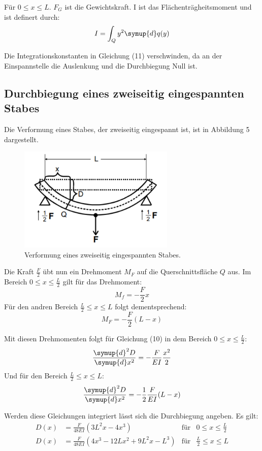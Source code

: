 Für $0 \leq x \leq L$. $F_G$ ist die Gewichtskraft. I ist das Flächenträgheitsmoment und ist definert durch:
\begin{equation}
  I = \int_Q y^2 \symup{d}q(y)
\end{equation}

Die Integrationskonstanten in Gleichung (11) verschwinden, da an der Einspannstelle
die Auslenkung und die Durchbiegung Null ist.

\subsection{Durchbiegung eines zweiseitig eingespannten Stabes}
Die Verformung eines Stabes, der zweiseitig eingespannt ist, ist in Abbildung 5
dargestellt.

\begin{figure}[H]
  \centering
  \includegraphics[height=5cm]{zweiseitig.PNG}
  \caption{Verformung eines zweiseitig eingespannten Stabes. \cite{sample}}
  \label{fig:zweiseitig}
\end{figure}

Die Kraft $\frac{F}{2}$ übt nun ein Drehmoment $M_F$ auf die Querschnittsfläche $Q$ aus.
Im Bereich $0 \leq x \leq \frac{L}{2}$ gilt für das Drehmoment:
\begin{equation}
  M_f = -\frac{F}{2}x
\end{equation}
Für den andren Bereich $\frac{L}{2} \leq x \leq L$ folgt dementsprechend:
\begin{equation}
  M_F = -\frac{F}{2}(L - x)
\end{equation}

Mit diesen Drehmomenten folgt für Gleichung (10) in dem Bereich $0 \leq x \leq \frac{L}{2}$:
\begin{equation}
  \frac{\symup{d}^2 D}{\symup{d} x^2} = - \frac{F}{EI}\frac{x^2}{2}
\end{equation}
Und für den Bereich $\frac{L}{2} \leq x \leq L$:
\begin{equation}
  \frac{\symup{d}^2 D}{\symup{d} x^2} = -\frac{1}{2} \frac{F}{EI}(L - x)
\end{equation}

Werden diese Gleichungen integriert lässt sich die Durchbiegung angeben. Es gilt:
\begin{align}
  D(x) &= \frac{F}{48EI} \left(3L^2x -4x^3 \right)   &\text{für}   &0 \leq x \leq \frac{L}{2} \\
  D(x) &= \frac{F}{48EI} \left(4x^3 -12Lx^2 + 9L^2x - L^3 \right)  &\text{für}   &\frac{L}{2} \leq x \leq L
\end{align}
